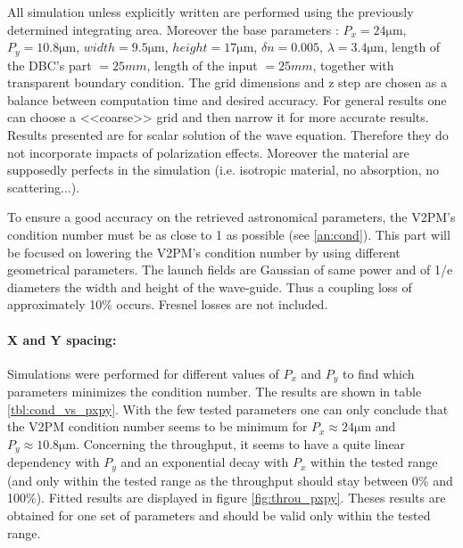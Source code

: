 All simulation unless explicitly written are performed using the previously determined integrating area. Moreover the base parameters : $P_x=24\si{\micro\meter}$, $P_y=10.8\si{\micro\meter}$,
$width=9.5\si{\micro\meter}$, $height=17\si{\micro\meter}$, $\delta n
= 0.005$, $\lambda=3.4\si{\micro\meter}$, length of the DBC's part $= 25mm$, length of the input $=25mm$, together with transparent boundary
condition. The grid dimensions and z step are chosen as a balance between computation time and desired accuracy. For general results one can
choose a <<coarse>> grid and then narrow it for more accurate results.
Results presented are for scalar solution of the wave equation. Therefore
they do not incorporate impacts of polarization effects. Moreover the material are supposedly
perfects in the simulation (i.e. isotropic material, no absorption, no scattering...).


To ensure a good accuracy on the retrieved astronomical parameters,
the V2PM's condition number must be as close to 1 as possible (see
\ref{an:cond}). This part will be focused on lowering the V2PM's
condition number by using different geometrical parameters. 
The launch fields are Gaussian of same power and of 1/e diameters the
width and height of the wave-guide. Thus a coupling loss of
approximately 10\% occurs. Fresnel losses are not included.

\paragraph{X and Y spacing:}
Simulations were performed for different values of $P_x$ and $P_y$ to
find which parameters minimizes the condition number. The results are
shown in table \ref{tbl:cond_vs_pxpy}. With the few tested parameters
one can only conclude that the V2PM condition number seems to be minimum for $P_x \approx 24 \si{\micro\meter}$ and $P_y \approx
10.8 \si{\micro\meter}$. Concerning the throughput, it seems to have a
quite linear dependency with $P_y$ and an exponential decay with $P_x$ within the tested
range (and only within the tested range as the throughput should stay between 0\% and 100\%). Fitted results are displayed in figure
\ref{fig:throu_pxpy}. Theses results are obtained for one set of
parameters and should be valid only within the tested range.

